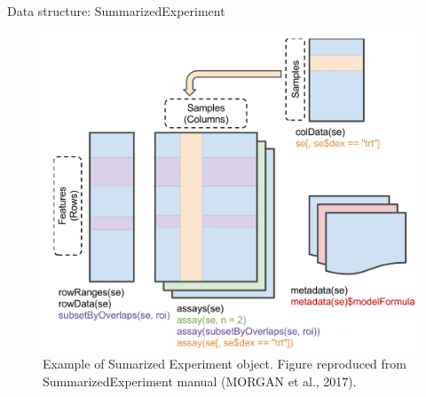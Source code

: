 \documentclass[slidestop,compress,11pt,xcolor=dvipsnames]{beamer}
\begin{document}
\begin{frame}{Data structure: SummarizedExperiment  }
 \vspace*{-0.5cm}
 \begin{figure}
  \centering
  \includegraphics[width=0.7\linewidth]{TCGAbiolinks/summarizedExperiment.png}
  \caption{Example of Sumarized Experiment object. Figure reproduced from SummarizedExperiment manual (MORGAN et al., 2017).}
 \end{figure}
\end{frame}
\end{document}
